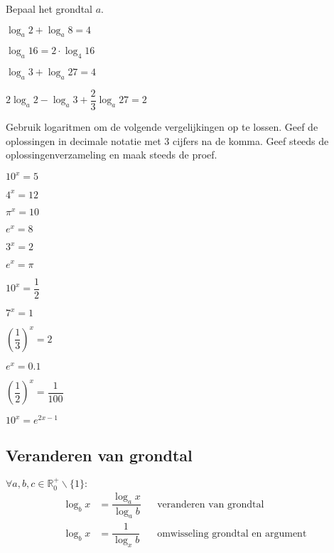 \documentclass[12pt,twoside]{article}
\begin{document}
\begin{oefening} %
Bepaal het grondtal $a$.
\begin{exlist}{2}
  \item $\log_a 2 + \log_a 8 = 4$
  \item $\log_a 16 = 2\cdot \log_4 16$
  \item $\log_a 3 + \log_a 27 = 4$
  \item $2 \log_a 2 - \log_a 3 + \dfrac{2}{3}\log_a 27 = 2$  
\end{exlist}
\end{oefening}

\begin{oefening} %
Gebruik logaritmen om de volgende vergelijkingen op te lossen. Geef de oplossingen in decimale notatie met 3 cijfers na de komma. Geef steeds de oplossingenverzameling en maak steeds de proef.
\begin{exlist}{2}
  \item $10^x=5$
  \item $4^x=12$
  \item $\pi^x=10$
  \item $e^x=8$
  \item $3^x=2$
  \item $e^x=\pi$
  \item $10^x=\dfrac{1}{2}$
  \item $7^x=1$
  \item $\left(\dfrac{1}{3}\right)^x=2$
  \item $e^x=0.1$
  \item $\left(\dfrac{1}{2}\right)^x=\dfrac{1}{100}$
  \item $10^x=e^{2x-1}$
\end{exlist}
\end{oefening}

\subsection{Veranderen van grondtal}

\begin{mdframed}
$\forall a,b,c \in \mathbb{R}_0^+\backslash\{1\}:$
\begin{align*}
\log_b x &= \dfrac{\log_a x}{\log_a b} && \mbox{veranderen van grondtal}\\
\log_b x &= \dfrac{1}{\log_x b} && \mbox{omwisseling grondtal en argument}
\end{align*}
\end{mdframed}
\end{document}
